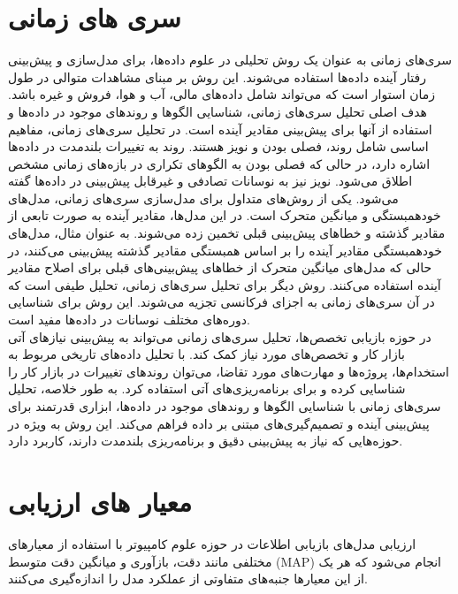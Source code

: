 \section{سری های زمانی}
\hspace*{2em}

سری‌های زمانی به عنوان یک روش تحلیلی در علوم داده‌ها، برای مدل‌سازی و پیش‌بینی رفتار آینده داده‌ها استفاده می‌شوند. این روش بر مبنای مشاهدات متوالی در طول زمان استوار است که می‌تواند شامل داده‌های مالی، آب و هوا، فروش و غیره باشد. هدف اصلی تحلیل سری‌های زمانی، شناسایی الگوها و روندهای موجود در داده‌ها و استفاده از آنها برای پیش‌بینی مقادیر آینده است. در تحلیل سری‌های زمانی، مفاهیم اساسی شامل روند، فصلی بودن و نویز هستند. روند به تغییرات بلندمدت در داده‌ها اشاره دارد، در حالی که فصلی بودن به الگوهای تکراری در بازه‌های زمانی مشخص اطلاق می‌شود. نویز نیز به نوسانات تصادفی و غیرقابل پیش‌بینی در داده‌ها گفته می‌شود. 
یکی از روش‌های متداول برای مدل‌سازی سری‌های زمانی، مدل‌های خودهمبستگی و میانگین متحرک است. در این مدل‌ها، مقادیر آینده به صورت تابعی از مقادیر گذشته و خطاهای پیش‌بینی قبلی تخمین زده می‌شوند. به عنوان مثال، مدل‌های خودهمبستگی مقادیر آینده را بر اساس همبستگی مقادیر گذشته پیش‌بینی می‌کنند، در حالی که مدل‌های میانگین متحرک از خطاهای پیش‌بینی‌های قبلی برای اصلاح مقادیر آینده استفاده می‌کنند. روش دیگر برای تحلیل سری‌های زمانی، تحلیل طیفی است که در آن سری‌های زمانی به اجزای فرکانسی تجزیه می‌شوند. این روش برای شناسایی دوره‌های مختلف نوسانات در داده‌ها مفید است.
\\
در حوزه بازیابی تخصص‌ها، تحلیل سری‌های زمانی می‌تواند به پیش‌بینی نیازهای آتی بازار کار و تخصص‌های مورد نیاز کمک کند. با تحلیل داده‌های تاریخی مربوط به استخدام‌ها، پروژه‌ها و مهارت‌های مورد تقاضا، می‌توان روندهای تغییرات در بازار کار را شناسایی کرده و برای برنامه‌ریزی‌های آتی استفاده کرد. به طور خلاصه، تحلیل سری‌های زمانی با شناسایی الگوها و روندهای موجود در داده‌ها، ابزاری قدرتمند برای پیش‌بینی آینده و تصمیم‌گیری‌های مبتنی بر داده فراهم می‌کند. این روش به ویژه در حوزه‌هایی که نیاز به پیش‌بینی دقیق و برنامه‌ریزی بلندمدت دارند، کاربرد دارد.


\section{معیار های ارزیابی}
\hspace*{2em}
ارزیابی مدل‌های بازیابی اطلاعات در حوزه علوم کامپیوتر با استفاده از معیارهای مختلفی مانند دقت، بازآوری و میانگین دقت متوسط (MAP) انجام می‌شود که هر یک از این معیارها جنبه‌های متفاوتی از عملکرد مدل را اندازه‌گیری می‌کنند.


